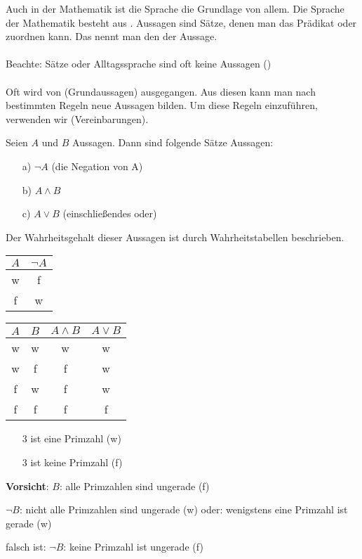 
Auch in der Mathematik ist die Sprache die Grundlage von allem. Die Sprache der Mathematik besteht aus . Aussagen sind Sätze, denen man das Prädikat  oder  zuordnen kann. Das nennt man den  der Aussage. \\
\\
Beachte: Sätze oder Alltagssprache sind oft keine Aussagen () \\
\\
Oft wird von  (Grundaussagen) ausgegangen. Aus diesen kann man nach bestimmten Regeln neue Aussagen bilden. Um diese Regeln einzuführen, verwenden wir  (Vereinbarungen).

\begin{defi}
	Seien $A$ und $B$ Aussagen. Dann sind folgende Sätze Aussagen:
	\begin{itemize}
		\item[a)] $\neg A$   (die Negation von A)
		\item[b)] $A\wedge B$  
		\item[c)] $A\vee B$   (einschließendes oder)
	\end{itemize}
\end{defi} 
Der Wahrheitsgehalt dieser Aussagen ist durch Wahrheitstabellen beschrieben.\\

\begin{center}
	\begin{tabular}{|c|c|}
		\hline
		$A$ & $\neg A$ \\
		\hline
		w & f \\
		f & w \\
		\hline
	\end{tabular}
	\hspace{2cm}
	\begin{tabular}{|c|c|c|c|}
		\hline
		$A$ & $B$ & $A\wedge B$ & $A\vee B$ \\
		\hline
		w & w & w & w \\
		w & f & f & w \\
		f & w & f & w \\
		f & f & f & f \\
		\hline
	\end{tabular}
\end{center}

\begin{bsp}
	\begin{itemize}
		\item[]
		\item[] 3 ist eine Primzahl (w)
		\item[] 3 ist keine Primzahl (f)
	\end{itemize}
	\textbf{Vorsicht}: $B$: alle Primzahlen sind ungerade (f) \par
	$\neg B$: nicht alle Primzahlen sind ungerade (w) oder: wenigstens eine Primzahl ist gerade (w)\par
	falsch ist: $\neg B$: keine Primzahl ist ungerade (f)
\end{bsp}

